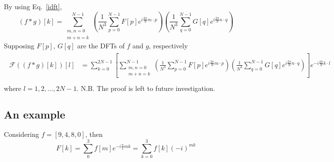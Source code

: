 \documentclass[11pt]{amsart}
\begin{document}
By using Eq.~\eqref{idft},
\begin{equation}
(f*g)[k] = \sum_{\substack{m,n = 0 \\ m+n = k} }^{N-1} \left( \frac{1}{N^3} \sum_{p=0}^{N-1}F[p] e^{i\frac{2\pi}{N}m\cdot p} \right)  \left( \frac{1}{N^3} \sum_{q=0}^{N-1}G[q] e^{i\frac{2\pi}{N}n\cdot q} \right)
\end{equation}
Supposing $F[p]$, $G[q]$ are the DFTs of  $f$ and $g$, respectively
\begin{align}
\begin{split}
\mathcal{F}((f*g)[k])[l] &=   \sum_{k=0}^{2N-1}\left[  \sum_{\substack{m,n = 0 \\ m+n = k} }^{N-1} \left( \frac{1}{N^3} \sum_{p=0}^{N-1}F[p] e^{i\frac{2\pi}{N}m\cdot p} \right)  \left( \frac{1}{N^3} \sum_{q=0}^{N-1}G[q] e^{i\frac{2\pi}{N}n\cdot q} \right) \right] e^{-i \frac{2\pi}{N}k\cdot l}\\\end{split}
\end{align}
where $l = 1, 2, \ldots, 2N-1$. N.B. The proof is left to future investigation.



\subsection{An example}
Considering $f = [9, 4, 8, 0]$, then $$
F[k]=\sum_{0}^{3} f[m] e^{-i \frac{\pi}{2} m k}=\sum_{k=0}^{3} f[k](-i)^{mk}
$$
\end{document}

